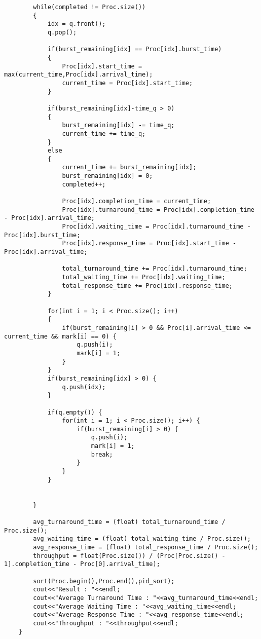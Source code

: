 \documentclass{article}
\begin{document}
\begin{enumerate}
{\begin{verbatim}
        while(completed != Proc.size())
        {
            idx = q.front();
            q.pop();
    
            if(burst_remaining[idx] == Proc[idx].burst_time) 
            {
                Proc[idx].start_time = max(current_time,Proc[idx].arrival_time);
                current_time = Proc[idx].start_time;
            }
    
            if(burst_remaining[idx]-time_q > 0) 
            {
                burst_remaining[idx] -= time_q;
                current_time += time_q;
            }
            else 
            {
                current_time += burst_remaining[idx];
                burst_remaining[idx] = 0;
                completed++;
    
                Proc[idx].completion_time = current_time;
                Proc[idx].turnaround_time = Proc[idx].completion_time - Proc[idx].arrival_time;
                Proc[idx].waiting_time = Proc[idx].turnaround_time - Proc[idx].burst_time;
                Proc[idx].response_time = Proc[idx].start_time - Proc[idx].arrival_time;
    
                total_turnaround_time += Proc[idx].turnaround_time;
                total_waiting_time += Proc[idx].waiting_time;
                total_response_time += Proc[idx].response_time;
            }
    
            for(int i = 1; i < Proc.size(); i++) 
            {
                if(burst_remaining[i] > 0 && Proc[i].arrival_time <= current_time && mark[i] == 0) {
                    q.push(i);
                    mark[i] = 1;
                }
            }
            if(burst_remaining[idx] > 0) {
                q.push(idx);
            }
    
            if(q.empty()) {
                for(int i = 1; i < Proc.size(); i++) {
                    if(burst_remaining[i] > 0) {
                        q.push(i);
                        mark[i] = 1;
                        break;
                    }
                }
            }
    
    
        }
    
        avg_turnaround_time = (float) total_turnaround_time / Proc.size();
        avg_waiting_time = (float) total_waiting_time / Proc.size();
        avg_response_time = (float) total_response_time / Proc.size();
        throughput = float(Proc.size()) / (Proc[Proc.size() - 1].completion_time - Proc[0].arrival_time);
    
        sort(Proc.begin(),Proc.end(),pid_sort);
        cout<<"Result : "<<endl;
        cout<<"Average Turnaround Time : "<<avg_turnaround_time<<endl;
        cout<<"Average Waiting Time : "<<avg_waiting_time<<endl;
        cout<<"Average Response Time : "<<avg_response_time<<endl;
        cout<<"Throughput : "<<throughput<<endl;
    }
    

\end{verbatim}}
\end{enumerate}
\end{document}
